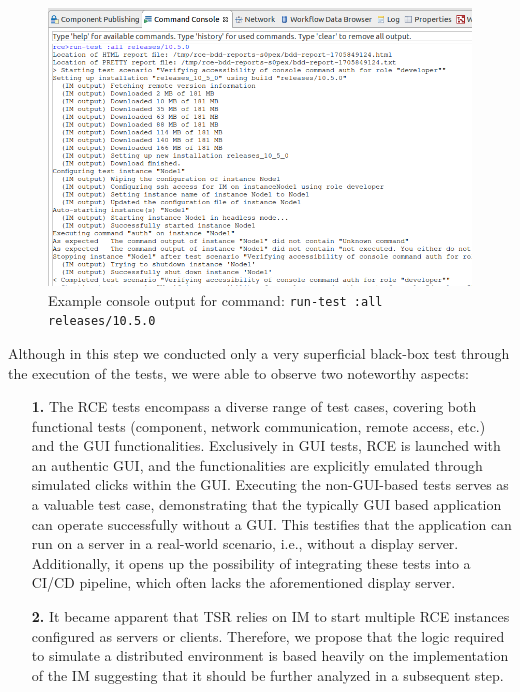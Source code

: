 \begin{figure}[!ht]
    \centering
    \includegraphics[width=\linewidth]{files/figures/rce-execute-tests.png}
    \caption{Example console output for command: \texttt{run-test :all releases/10.5.0}}
    \label{fig:rce-test-output}
\end{figure}

Although in this step we conducted only a very superficial black-box test through the execution of the tests, we were able to observe two noteworthy aspects:
\begin{itemize}
    \item[\textbf{1.}] The \ac{RCE} tests encompass a diverse range of test cases, covering both functional tests (component, network communication, remote access, etc.) and the \ac{GUI} functionalities. Exclusively in \ac{GUI} tests, \ac{RCE} is launched with an authentic \ac{GUI}, and the functionalities are explicitly emulated through simulated clicks within the \ac{GUI}.
    Executing the non-\acs{GUI}-based tests serves as a valuable test case, demonstrating that the typically \acs{GUI} based application can operate successfully without a \acs{GUI}. This testifies that the application can run on a server in a real-world scenario, i.e., without a display server. Additionally, it opens up the possibility of integrating these tests into a CI/CD pipeline, which often lacks the aforementioned display server.

    \item[\textbf{2.}] It became apparent that \ac{TSR} relies on \ac{IM} to start multiple \ac{RCE} instances configured as servers or clients. Therefore, we propose that the logic required to simulate a distributed environment is based heavily on the implementation of the \ac{IM} suggesting that it should be further analyzed in a subsequent step.

\end{itemize}


